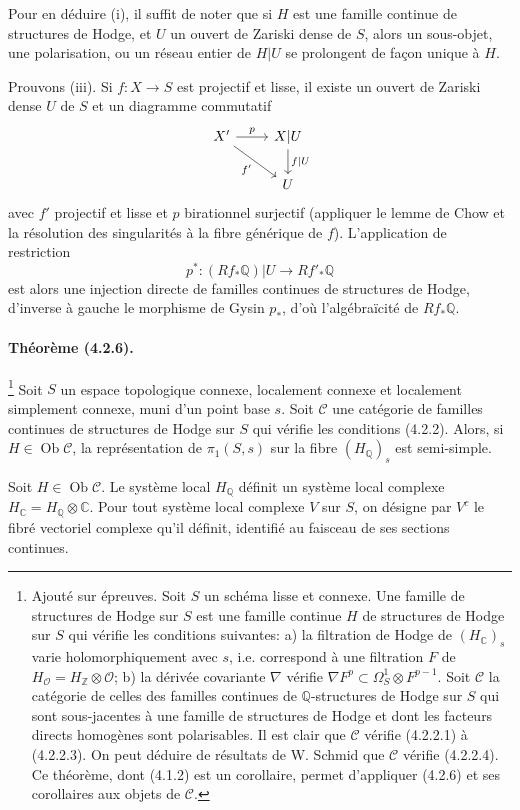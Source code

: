 \documentclass[10pt]{article}
\newcommand{\C}{\mathbb C}
\newcommand{\Q}{\mathbb Q}
\newcommand{\Z}{\mathbb Z}
\providecommand{\cO}{\mathcal O}
\providecommand{\cO}{\mathcal O}
\newcommand{\Ob}{\operatorname{Ob}}
\begin{document}
Pour en déduire (i), il suffit de noter que si $H$ est une famille continue de structures de Hodge, et $U$ un ouvert de Zariski dense de $S$, alors un sous-objet, une polarisation, ou un réseau entier de $H|U$ se prolongent de façon unique à $H$.

Prouvons (iii). Si $f:X\to S$ est projectif et lisse, il existe un ouvert de Zariski dense $U$ de $S$ et un diagramme commutatif
\[
\begin{tikzcd}[column sep=2.3em,row sep=1.8em]
X' \arrow[r,"p"] \arrow[dr,"f'"'] & X|U \arrow[d,"f|U"]\\
& U
\end{tikzcd}
\]
avec $f'$ projectif et lisse et $p$ birationnel surjectif (appliquer le lemme de Chow et la résolution des singularités à la fibre générique de $f$). L'application de restriction
\[
p^*:(Rf_*\Q)|U\longrightarrow Rf'_*\Q
\]
est alors une injection directe de familles continues de structures de Hodge, d'inverse à gauche le morphisme de Gysin $p_*$, d'où l'algébraïcité de $Rf_*\Q$.

\paragraph{Théorème (4.2.6).}\footnote{Ajouté sur épreuves. Soit $S$ un schéma lisse et connexe. Une famille de structures de Hodge sur $S$ est une famille continue $H$ de structures de Hodge sur $S$ qui vérifie les conditions suivantes: a) la filtration de Hodge de $(H_\C)_s$ varie holomorphiquement avec $s$, i.e. correspond à une filtration $F$ de $H_\cO=H_\Z\otimes\cO$; b) la dérivée covariante $\nabla$ vérifie $\nabla F^p\subset \Omega_S^1\otimes F^{p-1}$. Soit $\mathcal C$ la catégorie de celles des familles continues de $\Q$-structures de Hodge sur $S$ qui sont sous-jacentes à une famille de structures de Hodge et dont les facteurs directs homogènes sont polarisables. Il est clair que $\mathcal C$ vérifie (4.2.2.1) à (4.2.2.3). On peut déduire de résultats de W. Schmid que $\mathcal C$ vérifie (4.2.2.4). Ce théorème, dont (4.1.2) est un corollaire, permet d'appliquer (4.2.6) et ses corollaires aux objets de $\mathcal C$.} Soit $S$ un espace topologique connexe, localement connexe et localement simplement connexe, muni d'un point base $s$. Soit $\mathcal C$ une catégorie de familles continues de structures de Hodge sur $S$ qui vérifie les conditions (4.2.2). Alors, si $H\in\Ob\mathcal C$, la représentation de $\pi_1(S,s)$ sur la fibre $(H_\Q)_s$ est semi-simple.

Soit $H\in\Ob\mathcal C$. Le système local $H_\Q$ définit un système local complexe $H_\C=H_\Q\otimes\C$. Pour tout système local complexe $V$ sur $S$, on désigne par $V^c$ le fibré vectoriel complexe qu'il définit, identifié au faisceau de ses sections continues.
\end{document}
